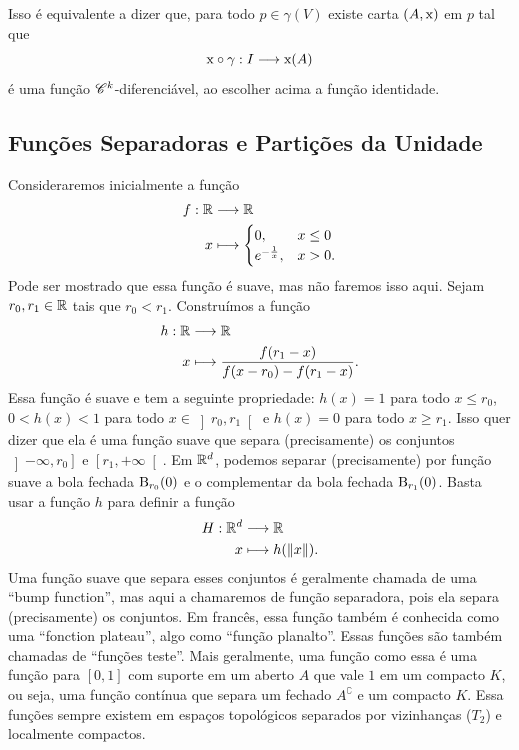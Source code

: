 Isso é equivalente a dizer que, para todo $p \in \gamma(V)$ existe carta $(A,\mathrm{x})$ em $p$ tal que
	\begin{equation*}
	\mathrm{x} \circ \gamma: I \longrightarrow \mathrm{x}(A)
	\end{equation*}
é uma função $\mathscr{C}^k$-diferenciável, ao escolher acima a função identidade.

\subsection{Funções Separadoras e Partições da Unidade}

Consideraremos inicialmente a função
	\begin{align*}
	{f}: {\mathbb{R}} &\longrightarrow {\mathbb{R}} \\{x} &\longmapsto {\begin{cases}
		0,& x \leq 0 \\
		e^{-\frac{1}{x}},& x > 0.
	\end{cases}}
	\end{align*}
Pode ser mostrado que essa função é suave, mas não faremos isso aqui. Sejam $r_0,r_1 \in \mathbb{R}$ tais que $r_0 < r_1$. Construímos a função
	\begin{align*}
	{h}: {\mathbb{R}} &\longrightarrow {\mathbb{R}} \\{x} &\longmapsto {\frac{f(r_1-x)}{f(x-r_0)-f(r_1-x)}}.
	\end{align*}
Essa função é suave e tem a seguinte propriedade: $h(x)=1$ para todo $x \leq r_0$, $0 < h(x) < 1$ para todo $x \in \left ]r_0, r_1\right [$ e $h(x)=0$ para todo $x \geq r_1$. Isso quer dizer que ela é uma função suave que separa (precisamente) os conjuntos $\left ]-\infty,r_0\right ]$ e $\left [r_1,+\infty\right [$. Em $\mathbb{R}^d$, podemos separar (precisamente) por função suave a bola fechada $\mathrm{B}_{r_0}(0)$ e o complementar da bola fechada $\mathrm{B}_{r_1}(0)$. Basta usar a função $h$ para definir a função%
	\begin{align*}
	{H}: {\mathbb{R}^d} &\longrightarrow {\mathbb{R}} \\{x} &\longmapsto {h(\left\Vert{x}\right\Vert)}.
	\end{align*}
Uma função suave que separa esses conjuntos é geralmente chamada de uma ``bump function'', mas aqui a chamaremos de função separadora, pois ela separa (precisamente) os conjuntos. Em francês, essa função também é conhecida como uma ``fonction plateau'', algo como ``função planalto''. Essas funções são também chamadas de ``funções teste''.
Mais geralmente, uma função como essa é uma função para $[0,1]$ com suporte em um aberto $A$ que vale $1$ em um compacto $K$, ou seja, uma função contínua que separa um fechado $A^\complement$ e um compacto $K$. Essa funções sempre existem em espaços topológicos separados por vizinhanças ($T_2$) e localmente compactos.

